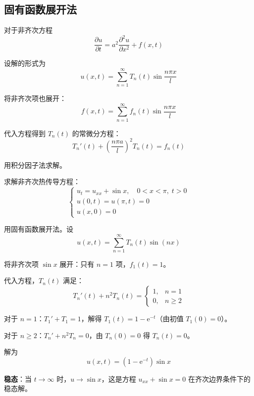 \subsection{固有函数展开法}

对于非齐次方程
\begin{equation}
    \frac{\partial u}{\partial t} = a^2\frac{\partial^2 u}{\partial x^2} + f(x, t)
\end{equation}

设解的形式为
\begin{equation}
    u(x, t) = \sum_{n=1}^{\infty} T_n(t)\sin\frac{n\pi x}{l}
\end{equation}

将非齐次项也展开：
\begin{equation}
    f(x, t) = \sum_{n=1}^{\infty} f_n(t)\sin\frac{n\pi x}{l}
\end{equation}

代入方程得到 $T_n(t)$ 的常微分方程：
\begin{equation}
    T_n'(t) + \left(\frac{n\pi a}{l}\right)^2 T_n(t) = f_n(t)
\end{equation}

用积分因子法求解。

\begin{lizi}{}{}
求解非齐次热传导方程：
\begin{equation}
    \begin{cases}
        u_t = u_{xx} + \sin x, \quad 0 < x < \pi, \; t > 0 \\
        u(0, t) = u(\pi, t) = 0 \\
        u(x, 0) = 0
    \end{cases}
\end{equation}

\begin{jie}
    用固有函数展开法。设
    \begin{equation}
        u(x, t) = \sum_{n=1}^{\infty} T_n(t)\sin(nx)
    \end{equation}

    将非齐次项 $\sin x$ 展开：只有 $n = 1$ 项，$f_1(t) = 1$。

    代入方程，$T_n(t)$ 满足：
    \begin{equation}
        T_n'(t) + n^2 T_n(t) = \begin{cases} 1, & n = 1 \\ 0, & n \geq 2 \end{cases}
    \end{equation}

    对于 $n = 1$：$T_1' + T_1 = 1$，解得 $T_1(t) = 1 - \mathrm{e}^{-t}$（由初值 $T_1(0) = 0$）。

    对于 $n \geq 2$：$T_n' + n^2 T_n = 0$，由 $T_n(0) = 0$ 得 $T_n(t) = 0$。

    解为
    \begin{equation}
        u(x, t) = (1 - \mathrm{e}^{-t})\sin x
    \end{equation}

    \textbf{稳态}：当 $t \to \infty$ 时，$u \to \sin x$，这是方程 $u_{xx} + \sin x = 0$ 在齐次边界条件下的稳态解。
\end{jie}
\end{lizi}


